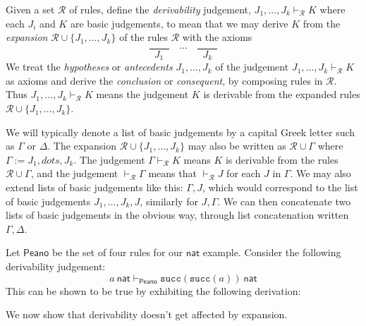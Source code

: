 \begin{defin}
    Given a set $\mathcal{R}$ of rules, define the \emph{derivability} judgement, $J_1,\dots,J_k \vdash_{\mathcal{R}} K$ where each $J_i$ and $K$ are basic judgements, to mean that we may derive $K$ from the \emph{expansion} $\mathcal{R} \cup \{ J_1, \dots, J_k \}$ of the rules $\mathcal{R}$ with the axioms
    $$
        \frac{\qquad}{J_1} \quad \cdots \quad \frac{\qquad}{J_k}
    $$
    We treat the \emph{hypotheses} or \emph{antecedents} $J_1, \dots, J_k$ of the judgement $J_1,\dots,J_k \vdash_{\mathcal{R}} K$ as axioms and derive the \emph{conclusion} or \emph{consequent}, by composing rules in $\mathcal{R}$. Thus $J_1,\dots,J_k \vdash_{\mathcal{R}} K$ means the judgement $K$ is derivable from the expanded rules $\mathcal{R} \cup \{ J_1, \dots, J_k \}$.
\end{defin}

\begin{remark}
    We will typically denote a list of basic judgements by a capital Greek letter such as $\Gamma$ or $\Delta$. The expansion $\mathcal{R} \cup \{ J_1, \dots, J_k \}$ may also be written as $\mathcal{R} \cup \Gamma$ where $\Gamma := J_1, dots, J_k$. The judgement $\Gamma \vdash_{\mathcal{R}} K$ means $K$ is derivable from the rules $\mathcal{R} \cup \Gamma$, and the judgement $\vdash _{\mathcal{R}} \Gamma$ means that $\vdash _{\mathcal{R}} J$ for each $J$ in $\Gamma$. We may also extend lists of basic judgements like this: $\Gamma, J$, which would correspond to the list of basic judgements $J_1, \dots, J_k, J$, similarly for $J, \Gamma$. We can then concatenate two lists of basic judgements in the obvious way, through list concatenation written $\Gamma, \Delta$.
\end{remark}

\begin{example}
    Let $\mathsf{Peano}$ be the set of four rules for our $\mathsf{nat}$ example. Consider the following derivability judgement:
    $$a\ \mathsf{nat} \vdash_{\mathsf{Peano}} \texttt{succ}(\texttt{succ}(a))\ \mathsf{nat}$$
    This can be shown to be true by exhibiting the following derivation:
    \begin{prooftree}
    \end{prooftree}
\end{example}

We now show that derivability doesn't get affected by expansion.

